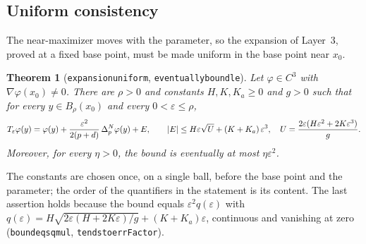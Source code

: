 \documentclass[11pt,reqno]{amsart}
\newcommand{\LEANREF}[1]{\texttt{\small\def\_{\textunderscore\allowbreak}#1}}
\newcommand{\eps}{\varepsilon}
\newcommand{\pnlap}{\Delta_p^{N}}
\newcommand{\Op}{T_\eps}
\DeclarePairedDelimiter{\abs}{\lvert}{\rvert}
\theoremstyle{plain}
\newtheorem{theorem}{Theorem}[section]
\theoremstyle{definition}
\begin{document}
\subsection{Uniform consistency}\label{ssec:unifcons}

The near-maximizer moves with the parameter, so the expansion of Layer~3,
proved at a fixed base point, must be made uniform in the base point near
$x_0$.

\begin{theorem}[\LEANREF{expansion\_uniform}, \LEANREF{eventually\_bound\_le}]
\label{thm:expunif}
Let $\varphi \in C^3$ with $\nabla\varphi(x_0) \ne 0$. There are $\rho > 0$ and
constants $H, K, K_a \ge 0$ and $g > 0$ such that for every
$y \in B_\rho(x_0)$ and every $0 < \eps \le \rho$,
\[
  \Op\varphi(y) = \varphi(y) + \frac{\eps^2}{2(p+d)}\,\pnlap\varphi(y) + E,
  \qquad
  \abs{E} \le H\eps\sqrt{U} + (K + K_a)\,\eps^3,
  \quad
  U = \frac{2\eps(H\eps^2 + 2K\eps^3)}{g}.
\]
Moreover, for every $\eta > 0$, the bound is eventually at most $\eta\eps^2$.
\end{theorem}

The constants are chosen once, on a single ball, before the base point and the
parameter; the order of the quantifiers in the statement is its content. The
last assertion holds because the bound equals $\eps^2 q(\eps)$ with
$q(\eps) = H\sqrt{2\eps(H + 2K\eps)/g} + (K + K_a)\eps$, continuous and
vanishing at zero (\LEANREF{bound\_eq\_sq\_mul}, \LEANREF{tendsto\_errFactor}).
\end{document}
